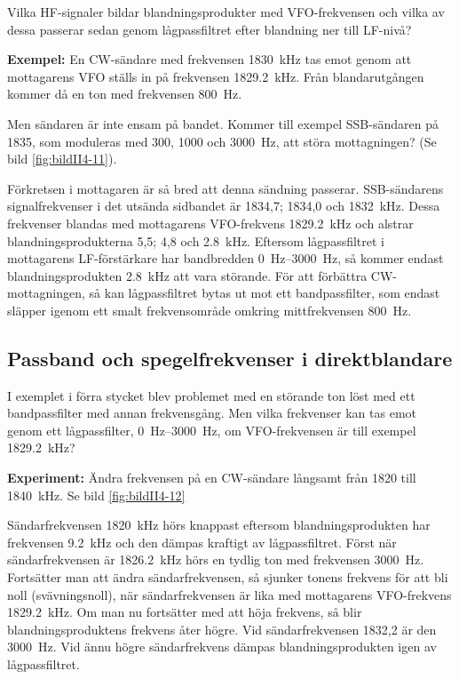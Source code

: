 Vilka HF-signaler bildar blandningsprodukter med VFO-frekvensen och
vilka av dessa passerar sedan genom lågpassfiltret efter blandning ner
till LF-nivå?

\textbf{Exempel:}
En CW-sändare med frekvensen \SI{1830}{\kilo\hertz} tas emot genom att
mottagarens VFO ställs in på frekvensen \SI{1829,2}{\kilo\hertz}.
Från blandarutgången kommer då en ton med frekvensen \SI{800}{\hertz}.

Men sändaren är inte ensam på bandet.
Kommer till exempel SSB-sändaren på 1835, som moduleras med 300, 1000 och
\SI{3000}{\hertz}, att störa mottagningen?
(Se bild \ref{fig:bildII4-11}).

Förkretsen i mottagaren är så bred att denna sändning passerar.
SSB-sändarens signalfrekvenser i det utsända sidbandet är 1834,7; 1834,0 och
\SI{1832}{\kilo\hertz}.
Dessa frekvenser blandas med mottagarens VFO-frekvens \SI{1829,2}{\kilo\hertz}
och alstrar blandningsprodukterna 5,5; 4,8 och \SI{2,8}{\kilo\hertz}.
Eftersom lågpassfiltret i mottagarens LF-förstärkare har bandbredden
\SIrange{0}{3000}{\hertz}, så kommer endast blandningsprodukten
\SI{2,8}{\kilo\hertz} att vara störande.
För att förbättra CW-mottagningen, så kan lågpassfiltret bytas ut mot ett
bandpassfilter, som endast släpper igenom ett smalt frekvensområde omkring
mittfrekvensen \SI{800}{\hertz}.

\subsection{Passband och spegelfrekvenser i direktblandare}
\label{passband_spegelfrekvens}

I exemplet i förra stycket blev problemet med en störande ton löst med
ett bandpassfilter med annan frekvensgång.
Men vilka frekvenser kan tas emot genom ett lågpassfilter,
\SIrange{0}{3000}{\hertz}, om VFO-frekvensen är till exempel
\SI{1829,2}{\kilo\hertz}?

\textbf{Experiment:}
Ändra frekvensen på en CW-sändare långsamt från 1820 till
\SI{1840}{\kilo\hertz}.
Se bild \ref{fig:bildII4-12}

Sändarfrekvensen \SI{1820}{\kilo\hertz} hörs knappast eftersom
blandningsprodukten har frekvensen \SI{9,2}{\kilo\hertz} och den dämpas kraftigt
av lågpassfiltret.
Först när sändarfrekvensen är \SI{1826,2}{\kilo\hertz} hörs en tydlig ton med
frekvensen \SI{3000}{\hertz}.
Fortsätter man att ändra sändarfrekvensen, så sjunker tonens frekvens för att
bli noll (svävningsnoll), när sändarfrekvensen är lika med mottagarens
VFO-frekvens \SI{1829,2}{\kilo\hertz}.
Om man nu fortsätter med att höja frekvens, så blir blandningsproduktens
frekvens åter högre.
Vid sändarfrekvensen 1832,2 är den \SI{3000}{\hertz}.
Vid ännu högre sändarfrekvens dämpas blandningsprodukten igen av lågpassfiltret.

